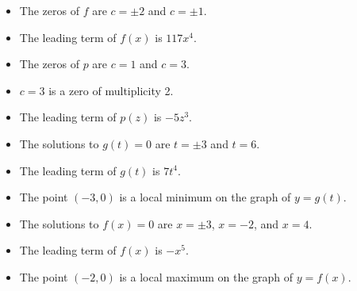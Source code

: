 \begin{exenum}

\item  \label{buildcomppolyfirst}

\begin{itemize}

\item The zeros of $f$ are $c = \pm 2$ and $c = \pm 1$.
\item The leading term of $f(x)$ is $117x^4$.

\end{itemize}

\item

\begin{itemize}

\item The zeros of $p$ are $c=1$ and $c = 3$.
\item $c=3$ is a zero of multiplicity 2.
\item The leading term of $p(z)$ is $-5z^3$.

\end{itemize}

\item

\begin{itemize}

\item The solutions to $g(t) = 0$ are $t = \pm 3$ and $t=6$.
\item The leading term of $g(t)$ is $7t^4$.
\item The point $(-3,0)$ is a local minimum on the graph of $y=g(t)$.

\end{itemize}

\item

\begin{itemize}

\item The solutions to $f(x) =0$ are $x = \pm 3$, $x=-2$, and $x=4$.
\item The leading term of $f(x)$ is $-x^5$.
\item The point $(-2, 0)$ is a local maximum on the graph of $y=f(x)$.

\end{itemize}

\item 

\begin{itemize}


\end{itemize}
\end{exenum}
